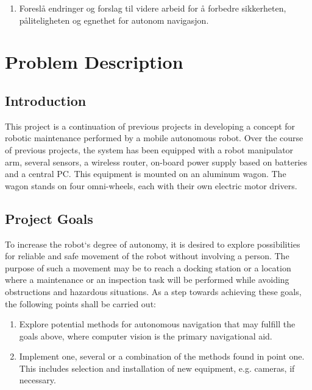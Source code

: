 \begin{multicols}{2}
\begin{enumerate}
	\item Foreslå endringer og forslag til videre arbeid for å forbedre sikkerheten, påliteligheten og egnethet for autonom navigasjon. 
	
	
\end{enumerate}

\columnbreak

\section*{Problem Description}

\subsection*{Introduction}

This project is a continuation of previous projects in developing a concept for robotic maintenance performed by a mobile autonomous robot.  Over the course of previous projects, the system has been equipped with a robot manipulator arm, several sensors, a wireless router, on-board power supply based on batteries and a central PC. This equipment is mounted on an aluminum wagon. The wagon stands on four omni-wheels, each with their own electric motor drivers.

\subsection*{Project Goals}

To increase the robot`s degree of autonomy, it is desired to explore possibilities for reliable and safe movement of the robot without involving a person. The purpose of such a movement may be to reach a docking station or a location where a maintenance or an inspection task will be performed while avoiding obstructions and hazardous situations. As a step towards achieving these goals, the following points shall be carried out:

\begin{enumerate}
	
	\item Explore potential methods for autonomous navigation that may fulfill the goals above, where computer vision is the primary navigational aid. 
	
	\item Implement one, several or a combination of the methods found in point one. This includes selection and installation of new equipment, e.g. cameras, if necessary. 
	

\end{enumerate}
\end{multicols}

